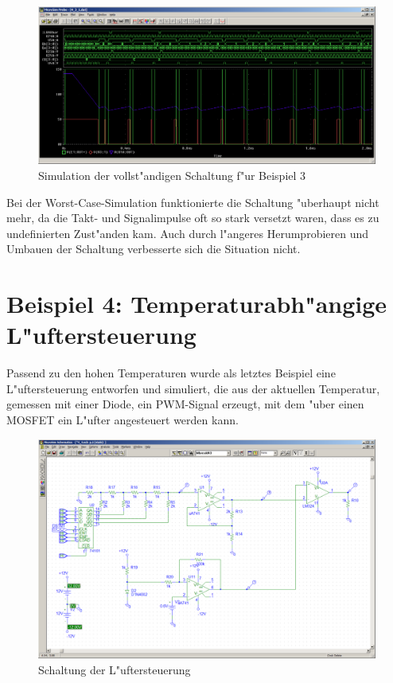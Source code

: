\begin{figure}[ht]
 \centering
 \includegraphics[width=\textwidth]{./img/4_3.PNG}
 \caption{Simulation der vollst"andigen Schaltung f"ur Beispiel 3}
 \label{fig:4_3}
\end{figure}

Bei der Worst-Case-Simulation funktionierte die Schaltung "uberhaupt nicht mehr, da die Takt- und Signalimpulse oft so stark versetzt waren, dass es zu undefinierten Zust"anden kam. Auch durch l"angeres Herumprobieren und Umbauen der Schaltung verbesserte sich die Situation nicht.


\clearpage
\section{Beispiel 4: Temperaturabh"angige L"uftersteuerung}

Passend zu den hohen Temperaturen wurde als letztes Beispiel eine L"uftersteuerung entworfen und simuliert, die aus der aktuellen Temperatur, gemessen mit einer Diode, ein PWM-Signal erzeugt, mit dem "uber einen MOSFET ein L"ufter angesteuert werden kann.

\begin{figure}[ht]
 \centering
 \includegraphics[width=\textwidth]{./img/4_4_schem.PNG}
 \caption{Schaltung der L"uftersteuerung}
 \label{fig:4_4_schem}
\end{figure}

